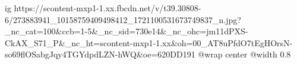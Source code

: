  
 
 
 
 

\ifcmt
  ig https://scontent-mxp1-1.xx.fbcdn.net/v/t39.30808-6/273883941_10158759409498412_1721100531673749837_n.jpg?_nc_cat=100&ccb=1-5&_nc_sid=730e14&_nc_ohc=jm11dPXS-CkAX_S71_P&_nc_ht=scontent-mxp1-1.xx&oh=00_AT8uPfdO7tEgHOrsN-so69flOSabgJqy4TGYdpdLZN-hWQ&oe=620DD191
  @wrap center
  @width 0.8
\fi
